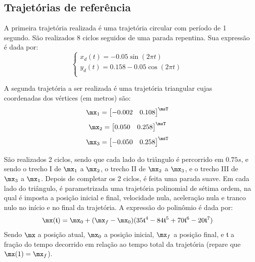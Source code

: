 \documentclass[]{politex}
\begin{document}
\subsection{Trajetórias de referência}

A primeira trajetória realizada é uma trajetória circular com período de 1 segundo. São realizados 8 ciclos seguidos de uma parada repentina. Sua expressão é dada por:
\begin{equation}
\begin{cases}
x_d(t) = -0.05 \sin(2\pi t) \\
y_d(t) = 0.158 - 0.05 \cos(2\pi t) \\
\end{cases}
\end{equation}

A segunda trajetória a ser realizada é uma trajetória triangular cujas coordenadas dos vértices (em metros) são:
\begin{equation} \label{eq:zeroMaquina}
\mx_1 = \begin{bmatrix}
-0.002 & 0.108 
\end{bmatrix}^\msT
\end{equation}
\begin{equation}
\mx_2 = \begin{bmatrix}
0.050 & 0.258 
\end{bmatrix}^\msT
\end{equation}
\begin{equation}
\mx_3 = \begin{bmatrix}
-0.050 & 0.258 
\end{bmatrix}^\msT
\end{equation}

São realizados 2 ciclos, sendo que cada lado do triângulo é percorrido em $0.75s$, e sendo o trecho I de $\mx_1$ a $\mx_2$, o trecho II de $\mx_2$ a $\mx_3$, e o trecho III de $\mx_3$ a $\mx_1$. Depois de completar os 2 ciclos, é feita uma parada suave. Em cada lado do triângulo, é parametrizada uma trajetória polinomial de sétima ordem, na qual é imposta a posição inicial e final, velocidade nula, aceleração nula e tranco nulo no início e no final da trajetória. A expressão do polinômio é dada por:
\begin{equation}
\mx(\mathfrak{t}) = \mx_0 + (\mx_f - \mx_0) (35 \mathfrak{t}^4 - 84 \mathfrak{t}^5 + 70 \mathfrak{t}^6 - 20 \mathfrak{t}^7)
\end{equation}
Sendo $\mx$ a posição atual, $\mx_0$ a posição inicial, $\mx_f$ a posição final, e $\mathfrak{t}$ a fração do tempo decorrido em relação ao tempo total da trajetória (repare que $\mx(1) = \mx_f$).
\end{document}

